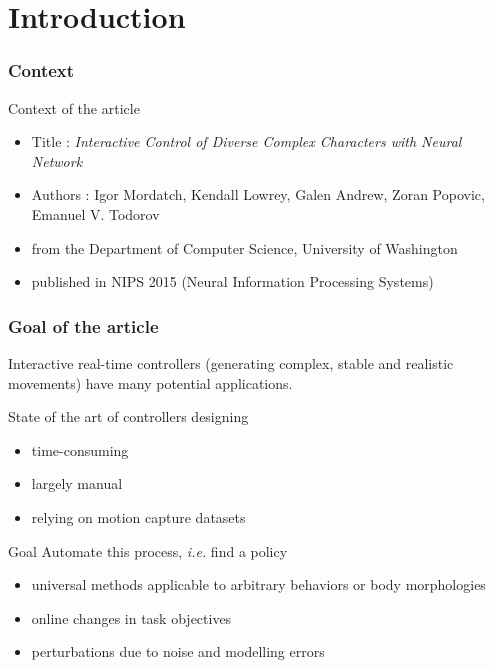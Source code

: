 \documentclass[mathserif]{beamer}
\begin{document}
\section{Introduction}

\begin{frame}
  \frametitle{{Context}}
  
\begin{block}{Context of the article}
\begin{itemize}
\item Title : \textit{Interactive Control of Diverse Complex Characters with Neural Network}
\item Authors : Igor Mordatch, Kendall Lowrey, Galen Andrew, Zoran Popovic, Emanuel V. Todorov
\item[] from the Department of Computer Science, University of Washington
\item published in NIPS 2015 (Neural Information Processing Systems)
\end{itemize}
\end{block}

\end{frame}


\begin{frame}
  \frametitle{{Goal of the article}}
  
  Interactive real-time controllers (generating complex, stable and realistic movements) have many potential applications.
  
\begin{block}{State of the art of controllers designing}
\begin{itemize}
\item time-consuming
\item largely manual 
\item relying on motion capture datasets
\end{itemize}
\end{block}

\pause

\begin{block}{Goal}
Automate this process, \textit{i.e.} find a policy 
\begin{itemize}
\item universal methods applicable to arbitrary behaviors or body morphologies
\item online changes in task objectives
\item perturbations due to noise and modelling errors
\end{itemize}
\end{block}


\end{frame}
\end{document}
